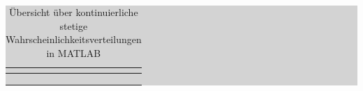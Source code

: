 \begin{table}[H]
\setlength{\arrayrulewidth}{.1em}
\caption{\"{U}bersicht \"{u}ber kontinuierliche stetige Wahrscheinlichkeitsverteilungen in MATLAB}
\setlength{\fboxsep}{0pt}%
\colorbox{lightgray}{%
%
\begin{tabular}{| c | c | c | c | c |}
\hline
\parbox[c][0.8in][c]{1.3in}{\smallskip\centering\textbf{\selectfont{Verteilung}}} &
\parbox[c][0.8in][c]{1.1in}{\smallskip\centering\textbf{\selectfont{Wahrscheinlich-keitsverteilung f(x)}}} &
\parbox[c][0.8in][c]{1.1in}{\smallskip\centering\textbf{\selectfont{Verteilungs-funktion F(x)}}} &
\parbox[c][0.8in][c]{1.1in}{\smallskip\centering\textbf{}} &
\parbox[c][0.8in][c]{1.4in}{\smallskip\centering\textbf{\selectfont{Zufallszahlen-generator}}}\\ \hline

\parbox[c][0.5in][c]{1.3in}{\centering{}\selectfont{Gleichverteilung}} & 
\parbox[c][0.5in][c]{1.1in}{\centering{}\selectfont{unifpdf(x,a,b)}} &
\parbox[c][0.5in][c]{1.1in}{\centering{}\selectfont{unidcdf(x,a,b)}} & 
\parbox[c][0.5in][c]{1.1in}{\centering{}\selectfont{unidinv(P,a,b)}}  & 
\parbox[c][0.5in][c]{1.4in}{\centering{}\selectfont{unifrnd(a,b)}} \\
\hline

\parbox[c][0.5in][c]{1.3in}{\centering{}\selectfont{Weibull
Verteilung}} & 
\parbox[c][0.5in][c]{1.1in}{\centering{}\selectfont{wblpdf(x,$\eta$,$\beta$)}} &
\parbox[c][0.5in][c]{1.1in}{\centering{}\selectfont{wblcdf(x,$\eta$,$\beta$)}} & 
\parbox[c][0.5in][c]{1.1in}{\centering{}\selectfont{wblinv(P,$\eta$,$\beta$)}}  & 
\parbox[c][0.5in][c]{1.4in}{\centering{}\selectfont{wblrnd($\eta$,$\beta$)}} \\
\hline

\parbox[c][0.5in][c]{1.3in}{\centering{}\selectfont{Exponential-
verteilung}} & 
\parbox[c][0.5in][c]{1.1in}{\centering{}\selectfont{exppdf(x,$\mu$)}} &
\parbox[c][0.5in][c]{1.1in}{\centering{}\selectfont{expcdf(x,$\mu$)}} & 
\parbox[c][0.5in][c]{1.1in}{\centering{}\selectfont{expinv(P,$\mu$)}}  & 
\parbox[c][0.5in][c]{1.4in}{\centering{}\selectfont{exprnd($\mu$)}} \\
\hline


\end{tabular}}
\end{table}
